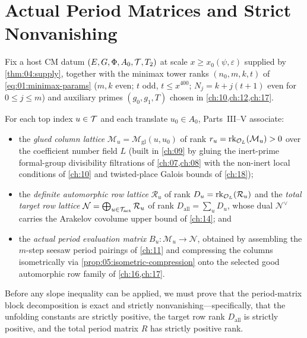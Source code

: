 \section{Actual Period Matrices and Strict Nonvanishing}
\label{sec:06:nonvanishing}

Fix a host CM datum $(E, G, \Phi, A_0, \mathcal{T}, T_2)$ at scale $x \ge x_0(\psi, \varepsilon)$ supplied by \cref{thm:04:supply}, together with the minimax tower ranks $(n_0, m, k, t)$ of \eqref{eq:01:minimax-params} ($m, k$ even; $t$ odd, $t \le x^{400}$; $N_j = k + j(t+1)$ even for $0 \le j \le m$) and auxiliary primes $(g_0, g_1, T)$ chosen in \cref{ch:10,ch:12,ch:17}.

For each top index $u \in \mathcal{T}$ and each translate $u_0 \in A_0$, Parts~III--V associate:
\begin{itemize}
\item the \emph{glued column lattice} $\mathcal{M}_u = \mathcal{M}_{\mathrm{gl}}(u, u_0)$ of rank $r_u = \operatorname{rk}_{\mathcal{O}_L}(\mathcal{M}_u) > 0$ over the coefficient number field $L$ (built in \cref{ch:09} by gluing the inert-prime formal-group divisibility filtrations of \cref{ch:07,ch:08} with the non-inert local conditions of \cref{ch:10} and twisted-place Galois bounds of \cref{ch:18});
\item the \emph{definite automorphic row lattice} $\mathcal{R}_u$ of rank $D_u = \operatorname{rk}_{\mathcal{O}_L}(\mathcal{R}_u)$ and the \emph{total target row lattice} $\mathcal{N} = \bigoplus_{u \in \mathcal{T}_{\mathrm{act}}} \mathcal{R}_u$ of rank $D_{\mathrm{all}} = \sum_{u} D_u$, whose dual $\mathcal{N}^\vee$ carries the Arakelov covolume upper bound of \cref{ch:14}; and
\item the \emph{actual period evaluation matrix} $B_u : \mathcal{M}_u \to \mathcal{N}$, obtained by assembling the $m$-step seesaw period pairings of \cref{ch:11} and compressing the columns isometrically via \cref{prop:05:isometric-compression} onto the selected good automorphic row family of \cref{ch:16,ch:17}.
\end{itemize}

Before any slope inequality can be applied, we must prove that the period-matrix block decomposition is exact and strictly nonvanishing—specifically, that the unfolding constants are strictly positive, the target row rank $D_{\mathrm{all}}$ is strictly positive, and the total period matrix $R$ has strictly positive rank.

